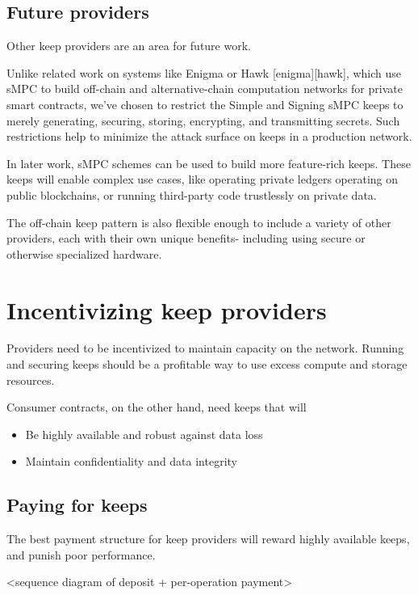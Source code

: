 \documentclass[11pt]{article}
\begin{document}
\subsection{Future providers}

Other keep providers are an area for future work.

Unlike related work on systems like Enigma or Hawk [enigma][hawk],
which use sMPC to build  off-chain and alternative-chain computation
networks for private smart contracts, we’ve chosen to restrict the
Simple  and Signing sMPC keeps to merely generating, securing,
storing, encrypting, and transmitting secrets. Such restrictions help
to minimize the attack surface on keeps in a production network.

In later work, sMPC schemes can be used to build more feature-rich
keeps. These keeps will enable complex use cases, like operating
private ledgers operating on public blockchains, or running
third-party code trustlessly on private data.

The off-chain keep pattern is also flexible enough to include a
variety of other providers, each with their own unique benefits-
including using secure or otherwise specialized hardware.


\section{Incentivizing keep providers}

Providers need to be incentivized to maintain capacity on the network.
Running and securing keeps should be a profitable way to use excess
compute and storage resources.

Consumer contracts, on the other hand, need keeps that will

\begin{itemize} \item Be highly available and robust against data loss
\item Maintain confidentiality and data integrity \end{itemize}

\subsection{Paying for keeps}

The best payment structure for keep providers will reward highly
available keeps, and punish poor performance.

<sequence diagram of deposit + per-operation payment>
\end{document}
